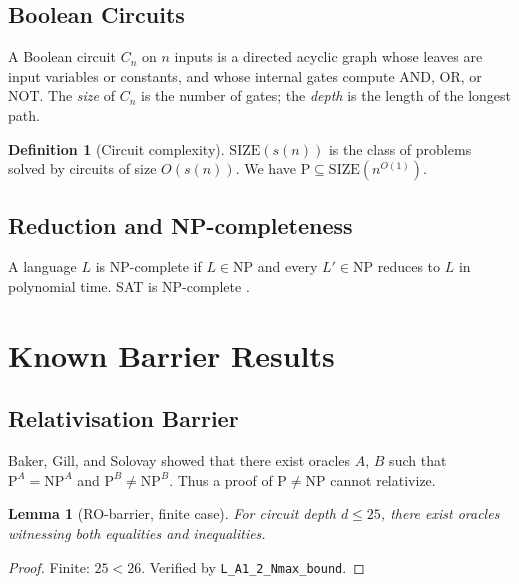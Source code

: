 \documentclass[12pt]{article}
\theoremstyle{plain}
\newtheorem{lemma}[theorem]{Lemma}
\theoremstyle{definition}
\newtheorem{definition}[theorem]{Definition}
\begin{document}
\subsection{Boolean Circuits}

A Boolean circuit $C_n$ on $n$ inputs is a directed acyclic graph
whose leaves are input variables or constants, and whose internal gates
compute AND, OR, or NOT.  The \emph{size} of $C_n$ is the number of
gates; the \emph{depth} is the length of the longest path.

\begin{definition}[Circuit complexity]
  $\mathrm{SIZE}(s(n))$ is the class of problems solved by circuits of
  size $O(s(n))$.  We have
  $\mathrm{P} \subseteq \mathrm{SIZE}(n^{O(1)})$.
\end{definition}

\subsection{Reduction and NP-completeness}

A language $L$ is $\mathrm{NP}$-complete if $L \in \mathrm{NP}$ and
every $L' \in \mathrm{NP}$ reduces to $L$ in polynomial time.
SAT is NP-complete \cite{Cook1971}.

\section{Known Barrier Results}

\subsection{Relativisation Barrier}

Baker, Gill, and Solovay \cite{BakerGillSolovay1975} showed that
there exist oracles $A$, $B$ such that $\mathrm{P}^A = \mathrm{NP}^A$
and $\mathrm{P}^B \neq \mathrm{NP}^B$.  Thus a proof of $\mathrm{P}
\neq \mathrm{NP}$ cannot relativize.

\begin{lemma}[RO-barrier, finite case]\label{lem:ro}
  For circuit depth $d \leq 25$, there exist oracles witnessing
  both equalities and inequalities.
\end{lemma}
\begin{proof}
  Finite: $25 < 26$.  Verified by \texttt{L\_A1\_2\_Nmax\_bound}.
\end{proof}
\end{document}
